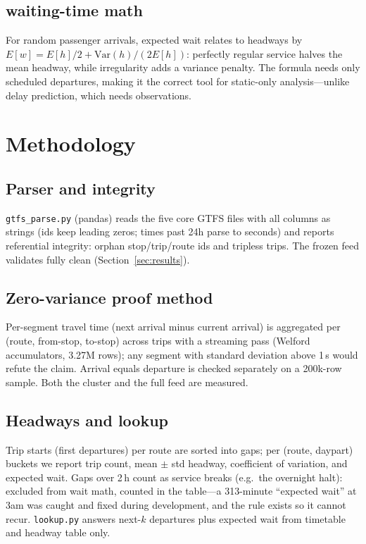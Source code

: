 \documentclass[11pt,a4paper]{article}
\begin{document}
\subsection{ waiting-time math}

For random passenger arrivals, expected wait relates to headways by $E[w] = E[h]/2 + \mathrm{Var}(h)/(2E[h])$: perfectly regular service halves the mean headway, while irregularity adds a variance penalty. The formula needs only scheduled departures, making it the correct tool for static-only analysis---unlike delay prediction, which needs observations.

\section{Methodology}

\subsection{Parser and integrity}

\verb!gtfs_parse.py! (pandas) reads the five core GTFS files with all columns as strings (ids keep leading zeros; times past 24h parse to seconds) and reports referential integrity: orphan stop/trip/route ids and tripless trips. The frozen feed validates fully clean (Section~\ref{sec:results}).

\subsection{Zero-variance proof method}

Per-segment travel time (next arrival minus current arrival) is aggregated per (route, from-stop, to-stop) across trips with a streaming pass (Welford accumulators, 3.27M rows); any segment with standard deviation above 1\,s would refute the claim. Arrival equals departure is checked separately on a 200k-row sample. Both the cluster and the full feed are measured.

\subsection{Headways and lookup}

Trip starts (first departures) per route are sorted into gaps; per (route, daypart) buckets we report trip count, mean $\pm$ std headway, coefficient of variation, and expected wait. Gaps over 2\,h count as service breaks (e.g.\ the overnight halt): excluded from wait math, counted in the table---a 313-minute ``expected wait'' at 3am was caught and fixed during development, and the rule exists so it cannot recur. \verb!lookup.py! answers next-$k$ departures plus expected wait from timetable and headway table only.
\end{document}
